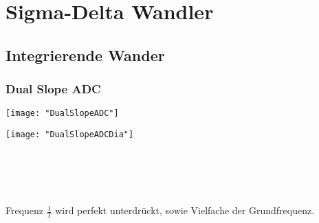 \section{Sigma-Delta Wandler}

\subsection{Integrierende Wander}

\subsubsection{Dual Slope ADC}
\begin{minipage}[t]{0.3\textwidth}
	\vspace{0pt}
	\texttt{[image: "DualSlopeADC"]}
\end{minipage}\hspace{0.05\textwidth}
\begin{minipage}[t]{0.3\textwidth}
	\vspace{0pt}
	\texttt{[image: "DualSlopeADCDia"]}
\end{minipage}\hspace{0.05\textwidth}
\begin{minipage}[t]{0.3\textwidth}
	\vspace{0pt}
	\\
	\\
	\\
	\\
	Frequenz $\frac{1}{T}$ wird perfekt unterdrückt, sowie Vielfache der Grundfrequenz.
\end{minipage}
\vspace{2mm}



